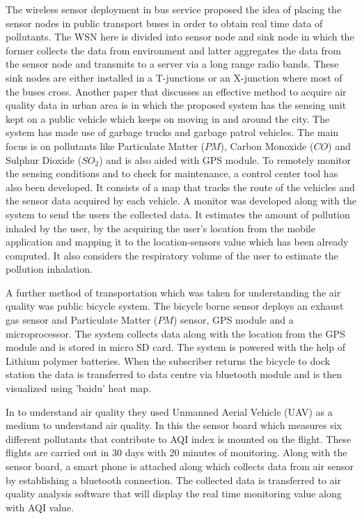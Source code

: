 The wireless sensor deployment in bus service \cite{Saha2017} proposed the idea of placing the sensor nodes in public transport buses in order to obtain real time data of pollutants. The WSN here is divided into sensor node and sink node in which the former collects the data from environment and latter aggregates the data from the sensor node and transmits to a server via a long range radio bands. These sink nodes are either installed in a T-junctions or an X-junction where most of the buses cross.
Another paper that  discusses an effective method to acquire air quality data in urban area is \cite {Shirai2016} in which the proposed system has the sensing unit kept on a public vehicle which keeps on moving in and around the city. The system has made use of garbage trucks and garbage patrol vehicles. The main focus is on pollutants like Particulate Matter ($PM$), Carbon Monoxide ($CO$) and Sulphur Dioxide ($SO_2$) and is also aided with GPS module. To remotely monitor the sensing conditions and to check for maintenance, a control center tool has also been developed. It consists of a map that tracks the route of the vehicles and the sensor data acquired by each vehicle. A monitor was developed along with the system to send the users the collected data. It estimates the amount of pollution inhaled by the user, by the acquiring the user's location from the mobile application and mapping it to the location-sensors value which has been already computed. It also considers the respiratory volume of the user to estimate the pollution inhalation.

A further method of transportation which was taken for understanding the air quality was public bicycle system. The bicycle borne sensor \cite{Xiang2016,Liu2015a} deploys an exhaust gas sensor and Particulate Matter ($PM$) sensor, GPS module and a microprocessor. The system collects data along with the location from the GPS module and is stored in micro SD card. The system is powered with the help of Lithium polymer batteries. When the subscriber returns the bicycle to dock station the data is transferred to data centre via bluetooth module and is then visualized using 'baidu' heat map. 

In \cite{Zhi2017} to understand air quality they used Unmanned Aerial Vehicle (UAV) as a medium to understand air quality.  In this the sensor board which measures six different pollutants that contribute to AQI index is mounted on the flight.  These flights are carried out in 30 days with 20 minutes of monitoring. Along with the sensor board, a smart phone is attached along which collects data from air sensor by establishing a bluetooth connection. The collected data is transferred to air quality analysis software that will display the real time monitoring value along with AQI value.

